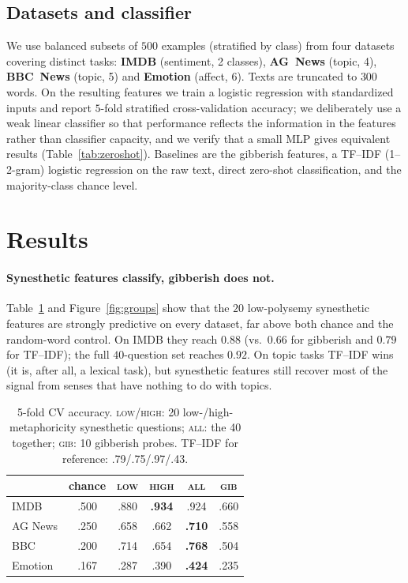 \documentclass[11pt]{article}
\begin{document}
\subsection{Datasets and classifier}
We use balanced subsets of $500$ examples (stratified by class) from four datasets covering distinct tasks: \textbf{IMDB} (sentiment, 2 classes), \textbf{AG~News} (topic, 4), \textbf{BBC~News} (topic, 5) and \textbf{Emotion} (affect, 6). Texts are truncated to $300$ words. On the resulting features we train a logistic regression with standardized inputs and report $5$-fold stratified cross-validation accuracy; we deliberately use a weak linear classifier so that performance reflects the information in the features rather than classifier capacity, and we verify that a small MLP gives equivalent results (Table~\ref{tab:zeroshot}). Baselines are the gibberish features, a TF--IDF (1--2-gram) logistic regression on the raw text, direct zero-shot classification, and the majority-class chance level.

\section{Results}
\paragraph{Synesthetic features classify, gibberish does not.}
Table~\ref{tab:main} and Figure~\ref{fig:groups} show that the $20$ low-polysemy synesthetic features are strongly predictive on every dataset, far above both chance and the random-word control. On IMDB they reach $0.88$ (vs.\ $0.66$ for gibberish and $0.79$ for TF--IDF); the full $40$-question set reaches $0.92$. On topic tasks TF--IDF wins (it is, after all, a lexical task), but synesthetic features still recover most of the signal from senses that have nothing to do with topics.

\begin{table}[t]
\centering\small
\begin{tabular}{lccccc}
\toprule
 & chance & \textsc{low} & \textsc{high} & \textsc{all} & \textsc{gib} \\
\midrule
IMDB     & .500 & .880 & \textbf{.934} & .924 & .660 \\
AG News  & .250 & .658 & .662 & \textbf{.710} & .558 \\
BBC      & .200 & .714 & .654 & \textbf{.768} & .504 \\
Emotion  & .167 & .287 & .390 & \textbf{.424} & .235 \\
\bottomrule
\end{tabular}
\caption{5-fold CV accuracy. \textsc{low}/\textsc{high}: 20 low-/high-metaphoricity synesthetic questions; \textsc{all}: the 40 together; \textsc{gib}: 10 gibberish probes. TF--IDF for reference: .79/.75/.97/.43.}
\label{tab:main}
\end{table}
\end{document}
